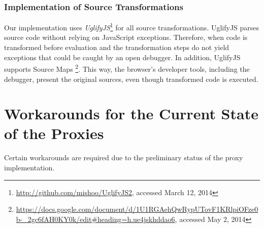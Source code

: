 













\subsubsection{Implementation of Source Transformations}

Our implementation uses \emph{UglifyJS}\footnote{\url{http://github.com/mishoo/UglifyJS2}, accessed March 12, 2014} for all source transformations.
UglifyJS parses source code without relying on JavaScript exceptions.
Therefore, when code is transformed before evaluation and the transformation steps do not yield exceptions that could be caught by an open debugger.
In addition, UglifyJS supports Source Maps \footnote{\url{https://docs.google.com/document/d/1U1RGAehQwRypUTovF1KRlpiOFze0b-_2gc6fAH0KY0k/edit\#heading=h.ue4jskhddao6}, accessed May 2, 2014}.
This way, the browser's developer tools, including the debugger, present the original sources, even though transformed code is executed.





\section{Workarounds for the Current State of the Proxies} \label{sec:IMPLEMENTATION:4}


Certain workarounds are required due to the preliminary status of the proxy implementation.

